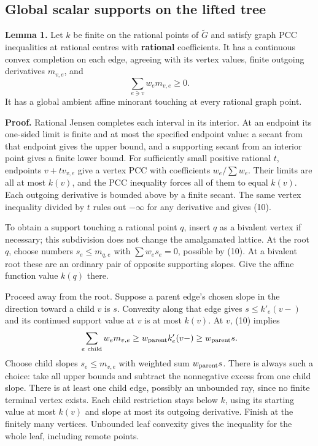 \documentclass[
  11pt,
]{article}
\begin{document}
\subsection{Global scalar supports on the lifted
tree}\label{global-scalar-supports-on-the-lifted-tree}

\textbf{Lemma 1.} Let \(k\) be finite on the rational points of
\(\widetilde G\) and satisfy graph PCC inequalities at rational centres
with \textbf{rational} coefficients. It has a continuous convex
completion on each edge, agreeing with its vertex values, finite
outgoing derivatives \(m_{v,e}\), and
\[\sum_{e\ni v}w_em_{v,e}\geq0. \tag{10}\] It has a global ambient
affine minorant touching at every rational graph point.

\textbf{Proof.} Rational Jensen completes each interval in its interior.
At an endpoint its one-sided limit is finite and at most the specified
endpoint value: a secant from that endpoint gives the upper bound, and a
supporting secant from an interior point gives a finite lower bound. For
sufficiently small positive rational \(t\), endpoints \(v+t v_{v,e}\)
give a vertex PCC with coefficients \(w_e/\sum w_e\). Their limits are
all at most \(k(v)\), and the PCC inequality forces all of them to equal
\(k(v)\). Each outgoing derivative is bounded above by a finite secant.
The same vertex inequality divided by \(t\) rules out \(-\infty\) for
any derivative and gives (10).

To obtain a support touching a rational point \(q\), insert \(q\) as a
bivalent vertex if necessary; this subdivision does not change the
amalgamated lattice. At the root \(q\), choose numbers
\(s_e\leq m_{q,e}\) with \(\sum w_es_e=0\), possible by (10). At a
bivalent root these are an ordinary pair of opposite supporting slopes.
Give the affine function value \(k(q)\) there.

Proceed away from the root. Suppose a parent edge's chosen slope in the
direction toward a child \(v\) is \(s\). Convexity along that edge gives
\(s\leq k'_e(v-)\) and its continued support value at \(v\) is at most
\(k(v)\). At \(v\), (10) implies
\[\sum_{e\ \mathrm{child}}w_em_{v,e}\geq w_{\rm parent}k'_e(v-)\geq w_{\rm parent}s.\]
Choose child slopes \(s_e\leq m_{v,e}\) with weighted sum
\(w_{\rm parent}s\). There is always such a choice: take all upper
bounds and subtract the nonnegative excess from one child slope. There
is at least one child edge, possibly an unbounded ray, since no finite
terminal vertex exists. Each child restriction stays below \(k\), using
its starting value at most \(k(v)\) and slope at most its outgoing
derivative. Finish at the finitely many vertices. Unbounded leaf
convexity gives the inequality for the whole leaf, including remote
points.
\end{document}
